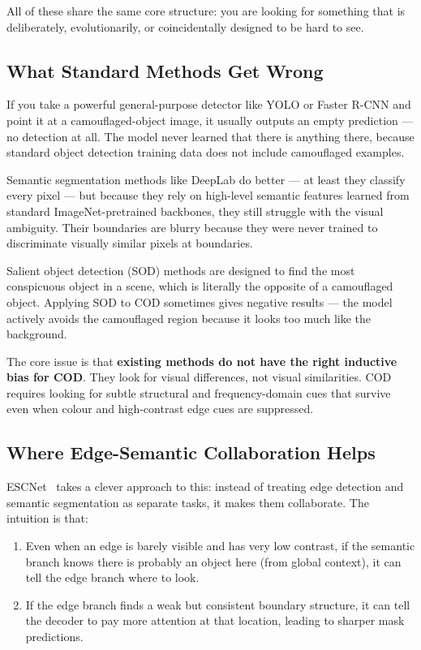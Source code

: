 \documentclass[12pt,a4paper]{report}
\begin{document}
All of these share the same core structure: you are looking for something that is deliberately, evolutionarily, or coincidentally designed to be hard to see.

\subsection*{What Standard Methods Get Wrong}

If you take a powerful general-purpose detector like YOLO or Faster R-CNN and point it at a camouflaged-object image, it usually outputs an empty prediction — no detection at all. The model never learned that there is anything there, because standard object detection training data does not include camouflaged examples.

Semantic segmentation methods like DeepLab do better — at least they classify every pixel — but because they rely on high-level semantic features learned from standard ImageNet-pretrained backbones, they still struggle with the visual ambiguity. Their boundaries are blurry because they were never trained to discriminate visually similar pixels at boundaries.

Salient object detection (SOD) methods are designed to find the most conspicuous object in a scene, which is literally the opposite of a camouflaged object. Applying SOD to COD sometimes gives negative results — the model actively avoids the camouflaged region because it looks too much like the background.

The core issue is that \textbf{existing methods do not have the right inductive bias for COD}. They look for visual differences, not visual similarities. COD requires looking for subtle structural and frequency-domain cues that survive even when colour and high-contrast edge cues are suppressed.

\subsection*{Where Edge-Semantic Collaboration Helps}

ESCNet~\cite{ye2025escnet} takes a clever approach to this: instead of treating edge detection and semantic segmentation as separate tasks, it makes them collaborate. The intuition is that:

\begin{enumerate}
  \item Even when an edge is barely visible and has very low contrast, if the semantic branch knows there is probably an object here (from global context), it can tell the edge branch where to look.
  \item If the edge branch finds a weak but consistent boundary structure, it can tell the decoder to pay more attention at that location, leading to sharper mask predictions.
\end{enumerate}
\end{document}
